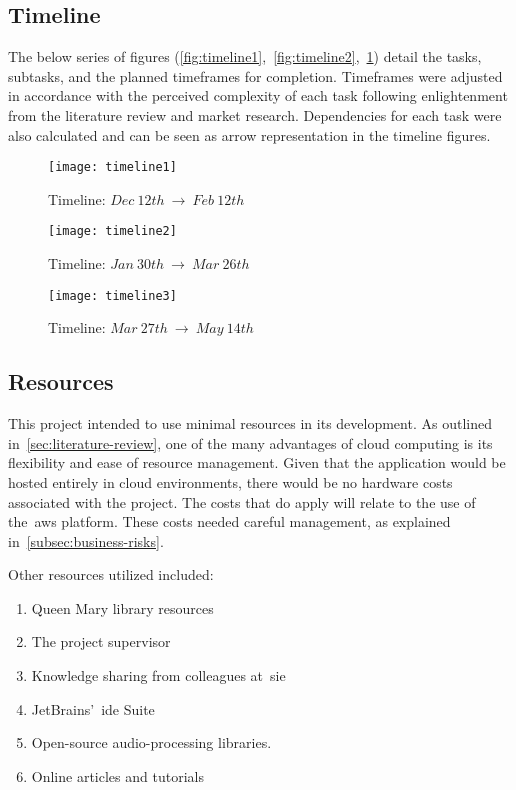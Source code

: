 \subsection{Timeline}\label{subsec:timeline}

The below series of figures (\ref{fig:timeline1},~\ref{fig:timeline2},~\ref{fig:timeline3}) detail the tasks, subtasks, and the planned timeframes for completion.
Timeframes were adjusted in accordance with the perceived complexity of each task following enlightenment from the literature review and market research.
Dependencies for each task were also calculated and can be seen as arrow representation in the timeline figures.

\begin{figure}[!htb]
    \minipage{\textwidth}
    \texttt{[image: timeline1]}
    \caption{Timeline: $Dec~12th~\rightarrow~Feb~12th$}\label{fig:timeline1}
    \endminipage\hfill
    \minipage{\textwidth}
    \texttt{[image: timeline2]}
    \caption{Timeline: $Jan~30th~\rightarrow~Mar~26th$}\label{fig:timeline2}
    \endminipage\hfill
    \minipage{\textwidth}
    \texttt{[image: timeline3]}
    \caption{Timeline: $Mar~27th~\rightarrow~May~14th$}\label{fig:timeline3}
    \endminipage
\end{figure}

\subsection{Resources}\label{subsec:resources}

This project intended to use minimal resources in its development.
As outlined in~\ref{sec:literature-review}, one of the many advantages of cloud computing is its flexibility and ease of resource management.
Given that the application would be hosted entirely in cloud environments, there would be no hardware costs associated with the project.
The costs that do apply will relate to the use of the~\gls{aws} platform.
These costs needed careful management, as explained in~\ref{subsec:business-risks}.

Other resources utilized included:

\begin{enumerate}
    \item Queen Mary library resources
    \item The project supervisor
    \item Knowledge sharing from colleagues at~\gls{sie}
    \item JetBrains’~\gls{ide} Suite
    \item Open-source audio-processing libraries.
    \item Online articles and tutorials
\end{enumerate}
